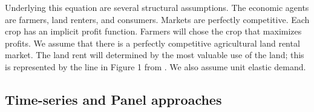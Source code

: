 \documentclass[10 pt]{article}
\newcommand{\cc}{\mathbf{c}}
\newcommand{\xx}{\mathbf{x}}
\begin{document}
\begin{outline}

Underlying this equation are several structural assumptions.
The economic agents are farmers, land renters, and consumers. 
Markets are perfectly competitive.
Each crop has an implicit profit function. 
Farmers will chose the crop that maximizes profits. 
We assume that there is a perfectly competitive agricultural land rental market. 
The land rent will determined by the most valuable use of the land; this is represented by the line in Figure 1 from \textcite{MNS94}. %
We also assume unit elastic demand. %










\end{outline}


\subsection{Time-series and Panel approaches}
\end{document}
